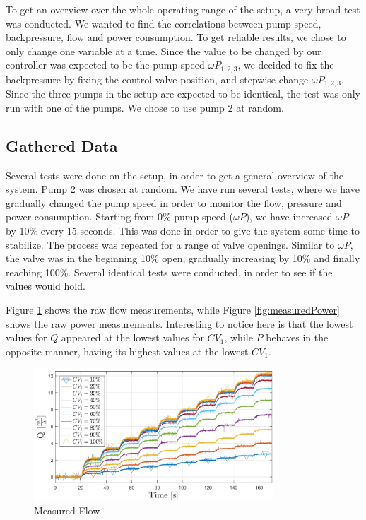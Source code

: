 To get an overview over the whole operating range of the setup,
a very broad test was conducted.
We wanted to find the correlations between pump speed, backpressure, flow and power consumption.
To get reliable results, we chose to only change one variable at a time.
Since the value to be changed by our controller was expected to be the pump speed $\omega P_{1,2,3}$,
we decided to fix the backpressure by fixing the control valve position,
and stepwise change $\omega P_{1,2,3}$.
Since the three pumps in the setup are expected to be identical,
the test was only run with one of the pumps.
We chose to use pump 2 at random.

\subsection{Gathered Data}
Several tests were done on the setup, in order to get a general overview of the system.
Pump 2 was chosen at random.
We have run several tests, where we have gradually changed the pump speed in order to monitor
the flow, pressure and power consumption.
Starting from 0\% pump speed ($\omega P$), we have increased $\omega P$ by 10\% every 15 seconds.
This was done in order to give the system some time to stabilize.
The process was repeated for a range of valve openings.
Similar to $\omega P$, the valve was in the beginning 10\% open,
gradually increasing by 10\% and finally reaching 100\%.
Several identical tests were conducted, in order to see if the values would hold.

Figure \ref{fig:measuredFlow} shows the raw flow measurements,
while Figure \ref{fig:measuredPower} shows the raw power measurements.
Interesting to notice here is that the lowest values for $Q$ appeared at the lowest values for $CV_1$,
while $P$ behaves in the opposite manner, having its highest values at the lowest $CV_1$.
\begin{figure}[H]
	\centering
	\includegraphics[width=0.8\textwidth]{figures/05mathematicalModelling/measuredFlow.eps}
	\caption{Measured Flow}
	\label{fig:measuredFlow}
\end{figure}

